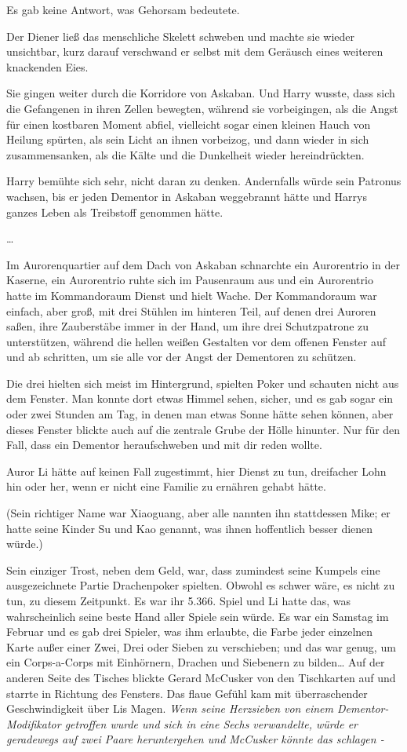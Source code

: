 {Es gab keine Antwort, was Gehorsam bedeutete.

Der Diener ließ das menschliche Skelett schweben und machte sie wieder unsichtbar, kurz darauf verschwand er selbst mit dem Geräusch eines weiteren knackenden Eies.

Sie gingen weiter durch die Korridore von Askaban. Und Harry wusste, dass sich die Gefangenen in ihren Zellen bewegten, während sie vorbeigingen, als die Angst für einen kostbaren Moment abfiel, vielleicht sogar einen kleinen Hauch von Heilung spürten, als sein Licht an ihnen vorbeizog, und dann wieder in sich zusammensanken, als die Kälte und die Dunkelheit wieder hereindrückten.

Harry bemühte sich sehr, nicht daran zu denken. Andernfalls würde sein Patronus wachsen, bis er jeden Dementor in Askaban weggebrannt hätte und Harrys ganzes Leben als Treibstoff genommen hätte.

…

Im Aurorenquartier auf dem Dach von Askaban schnarchte ein Aurorentrio in der Kaserne, ein Aurorentrio ruhte sich im Pausenraum aus und ein Aurorentrio hatte im Kommandoraum Dienst und hielt Wache. Der Kommandoraum war einfach, aber groß, mit drei Stühlen im hinteren Teil, auf denen drei Auroren saßen, ihre Zauberstäbe immer in der Hand, um ihre drei Schutzpatrone zu unterstützen, während die hellen weißen Gestalten vor dem offenen Fenster auf und ab schritten, um sie alle vor der Angst der Dementoren zu schützen.

Die drei hielten sich meist im Hintergrund, spielten Poker und schauten nicht aus dem Fenster. Man konnte dort etwas Himmel sehen, sicher, und es gab sogar ein oder zwei Stunden am Tag, in denen man etwas Sonne hätte sehen können, aber dieses Fenster blickte auch auf die zentrale Grube der Hölle hinunter. Nur für den Fall, dass ein Dementor heraufschweben und mit dir reden wollte.

Auror Li hätte auf keinen Fall zugestimmt, hier Dienst zu tun, dreifacher Lohn hin oder her, wenn er nicht eine Familie zu ernähren gehabt hätte.

(Sein richtiger Name war Xiaoguang, aber alle nannten ihn stattdessen Mike; er hatte seine Kinder Su und Kao genannt, was ihnen hoffentlich besser dienen würde.)

Sein einziger Trost, neben dem Geld, war, dass zumindest seine Kumpels eine ausgezeichnete Partie Drachenpoker spielten. Obwohl es schwer wäre, es nicht zu tun, zu diesem Zeitpunkt. Es war ihr 5.366. Spiel und Li hatte das, was wahrscheinlich seine beste Hand aller Spiele sein würde. Es war ein Samstag im Februar und es gab drei Spieler, was ihm erlaubte, die Farbe jeder einzelnen Karte außer einer Zwei, Drei oder Sieben zu verschieben; und das war genug, um ein Corps-a-Corps mit Einhörnern, Drachen und Siebenern zu bilden… Auf der anderen Seite des Tisches blickte Gerard McCusker von den Tischkarten auf und starrte in Richtung des Fensters. Das flaue Gefühl kam mit überraschender Geschwindigkeit über Lis Magen. \emph{Wenn seine Herzsieben von einem Dementor-Modifikator getroffen wurde und sich in eine Sechs verwandelte, würde er geradewegs auf zwei Paare heruntergehen und McCusker könnte das schlagen -}

}
